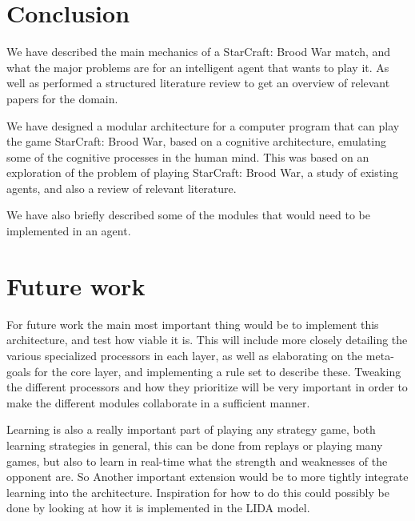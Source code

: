 \section{Conclusion}
We have described the main mechanics of a StarCraft: Brood War match, and what the
major problems are for an intelligent agent that wants to play it. As well as performed a structured literature review to get an overview of relevant papers for the domain.

We have designed a modular architecture for a computer program that can play the
game StarCraft: Brood War, based on a cognitive architecture, emulating some of
the cognitive processes in the human mind. This was based on an exploration of
the problem of playing StarCraft: Brood War, a study of existing agents, and
also a review of relevant literature.

We have also briefly described some of the modules that would need to be
implemented in an agent.

\section{Future work}
\label{sec:futurework}
For future work the main most important thing would be to implement this architecture, and test how viable it is. This will include more closely detailing the various
specialized processors in each layer, as well as elaborating on the meta-goals
for the core layer, and implementing a rule set to describe these. Tweaking the different processors and how they prioritize will be very important in order to make the different modules collaborate in a sufficient manner.  

Learning is also a really important part of playing any strategy game, both learning strategies in general, this can be done from replays or playing many games, but also to learn in real-time what the strength and weaknesses of the opponent are. So Another important extension would be to more tightly integrate learning into
the architecture. Inspiration for how to do this could possibly be done by
looking at how it is implemented in the LIDA model\cite{franklin2007lida}.